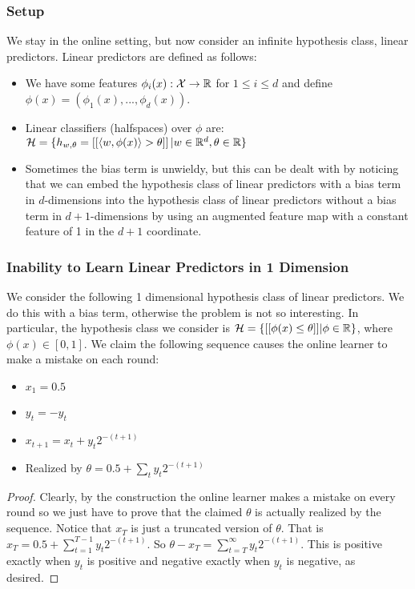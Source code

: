 \documentclass{article}
\begin{document}
\subsubsection{Setup}
We stay in the online setting, but now consider an infinite hypothesis class, linear predictors. Linear predictors are defined as follows:
\begin{itemize}
    \item We have some features $\phi_i(x): \mathcal{X} \rightarrow \mathbb{R}$ for $1 \leq i \leq d$ and define $\phi(x) = (\phi_1(x),...,\phi_d(x))$.
    \item Linear classifiers (halfspaces) over $\phi$ are: $\mathcal{H} = \{ h_{w, \theta} = \left [ \left[\left<w, \phi(x) \right>  > \theta\right]\right] | w \in \mathbb{R}^{d}, \theta \in \mathbb{R} \}$
    \item Sometimes the bias term is unwieldy, but this can be dealt with by noticing that we can embed the hypothesis class of linear predictors with a bias term in $d$-dimensions into the hypothesis class of linear predictors without a bias term in $d+1$-dimensions by using an augmented feature map with a constant feature of 1 in the $d+1$ coordinate.
\end{itemize}



\subsubsection{Inability to Learn Linear Predictors in 1 Dimension}
We consider the following 1 dimensional hypothesis class of linear predictors. We do this with a bias term, otherwise the problem is not so interesting. In particular, the hypothesis class we consider is $\mathcal{H} = \{ [[\phi(x) \leq \theta ]] | \phi \in \mathbb{R} \}$, where $\phi(x) \in [0,1]$. We claim the following sequence causes the online learner to make a mistake on each round:
\begin{itemize}
    \item $x_1 = 0.5$
    \item $y_t = -\hat{y}_t$
    \item $x_{t+1} = x_t + y_t2^{-(t+1)}$
    \item Realized by $\theta = 0.5 + \sum_{t}y_t2^{-(t+1)}$
\end{itemize}
\begin{proof}
Clearly, by the construction the online learner makes a mistake on every round so we just have to prove that the claimed $\theta$ is actually realized by the sequence. Notice that $x_T$ is just a truncated version of $\theta$. That is $x_T = 0.5 + \sum_{t=1}^{T-1}y_t2^{-(t+1)}$. So $\theta - x_T = \sum_{t=T}^{\infty}y_t2^{-(t+1)}$. This is positive exactly when $y_t$ is positive and negative exactly when $y_t$ is negative, as desired.

\end{proof}
\end{document}
